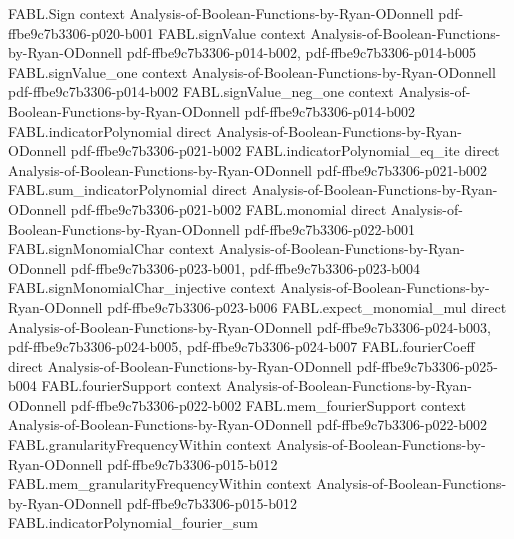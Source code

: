 \begin{theorem}
\label{FABL.noiseStability_const_one}
\leanok
{}
\proofstep
  {FABL.Sign}
  {context}
  {Analysis-of-Boolean-Functions-by-Ryan-ODonnell}
  {pdf-ffbe9c7b3306-p020-b001}
\proofstep
  {FABL.signValue}
  {context}
  {Analysis-of-Boolean-Functions-by-Ryan-ODonnell}
  {pdf-ffbe9c7b3306-p014-b002,
    pdf-ffbe9c7b3306-p014-b005}
\proofstep
  {FABL.signValue_one}
  {context}
  {Analysis-of-Boolean-Functions-by-Ryan-ODonnell}
  {pdf-ffbe9c7b3306-p014-b002}
\proofstep
  {FABL.signValue_neg_one}
  {context}
  {Analysis-of-Boolean-Functions-by-Ryan-ODonnell}
  {pdf-ffbe9c7b3306-p014-b002}
\proofstep
  {FABL.indicatorPolynomial}
  {direct}
  {Analysis-of-Boolean-Functions-by-Ryan-ODonnell}
  {pdf-ffbe9c7b3306-p021-b002}
\proofstep
  {FABL.indicatorPolynomial_eq_ite}
  {direct}
  {Analysis-of-Boolean-Functions-by-Ryan-ODonnell}
  {pdf-ffbe9c7b3306-p021-b002}
\proofstep
  {FABL.sum_indicatorPolynomial}
  {direct}
  {Analysis-of-Boolean-Functions-by-Ryan-ODonnell}
  {pdf-ffbe9c7b3306-p021-b002}
\proofstep
  {FABL.monomial}
  {direct}
  {Analysis-of-Boolean-Functions-by-Ryan-ODonnell}
  {pdf-ffbe9c7b3306-p022-b001}
\proofstep
  {FABL.signMonomialChar}
  {context}
  {Analysis-of-Boolean-Functions-by-Ryan-ODonnell}
  {pdf-ffbe9c7b3306-p023-b001,
    pdf-ffbe9c7b3306-p023-b004}
\proofstep
  {FABL.signMonomialChar_injective}
  {context}
  {Analysis-of-Boolean-Functions-by-Ryan-ODonnell}
  {pdf-ffbe9c7b3306-p023-b006}
\proofstep
  {FABL.expect_monomial_mul}
  {direct}
  {Analysis-of-Boolean-Functions-by-Ryan-ODonnell}
  {pdf-ffbe9c7b3306-p024-b003,
    pdf-ffbe9c7b3306-p024-b005,
    pdf-ffbe9c7b3306-p024-b007}
\proofstep
  {FABL.fourierCoeff}
  {direct}
  {Analysis-of-Boolean-Functions-by-Ryan-ODonnell}
  {pdf-ffbe9c7b3306-p025-b004}
\proofstep
  {FABL.fourierSupport}
  {context}
  {Analysis-of-Boolean-Functions-by-Ryan-ODonnell}
  {pdf-ffbe9c7b3306-p022-b002}
\proofstep
  {FABL.mem_fourierSupport}
  {context}
  {Analysis-of-Boolean-Functions-by-Ryan-ODonnell}
  {pdf-ffbe9c7b3306-p022-b002}
\proofstep
  {FABL.granularityFrequencyWithin}
  {context}
  {Analysis-of-Boolean-Functions-by-Ryan-ODonnell}
  {pdf-ffbe9c7b3306-p015-b012}
\proofstep
  {FABL.mem_granularityFrequencyWithin}
  {context}
  {Analysis-of-Boolean-Functions-by-Ryan-ODonnell}
  {pdf-ffbe9c7b3306-p015-b012}
\proofstep
  {FABL.indicatorPolynomial_fourier_sum}

\end{theorem}
